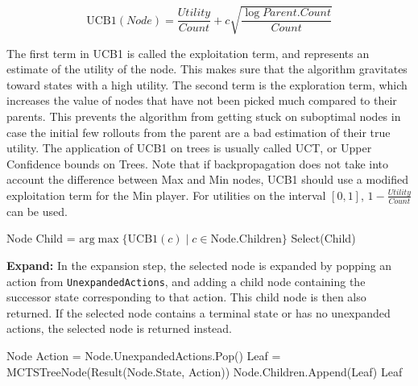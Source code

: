 \begin{equation}
    \text{UCB1}(Node) = \frac{Utility}{Count} + 
    c\sqrt{\frac{\log{Parent.Count}}{Count}}
\end{equation}

The first term in UCB1 is called the exploitation term, and represents
an estimate of the utility of the node. This makes sure that the algorithm
gravitates toward states with a high utility. The second term is the
exploration term, which increases the value of nodes that have not been
picked much compared to their parents. This prevents the algorithm from
getting stuck on suboptimal nodes in case the initial few rollouts from
the parent are a bad estimation of their true utility. The application
of UCB1 on trees is usually called UCT, or Upper Confidence bounds on Trees.
Note that if backpropagation does not take into account the difference
between Max and Min nodes, UCB1 should use a modified exploitation term 
for the Min player. For utilities on the interval $[0,1]$, 
$1 - \frac{Utility}{Count}$ can be used.
\begin{algorithm}
    \begin{algorithmic}[1]
                \State \Return Node
            \EndIf
            \State Child = 
            $\text{arg}\max \{ \text{UCB1}(c) \;|\; c \in \text{Node.Children} \}$ 
            \State \Return Select(Child)
        \EndProcedure
    \end{algorithmic}        
\end{algorithm}

\textbf{Expand:} In the expansion step, the selected node is expanded by 
popping an action from \lstinline|UnexpandedActions|, and adding a child 
node containing the successor state corresponding to that action. This
child node is then also returned. If the selected node contains a terminal 
state or has no unexpanded actions, the selected node is returned instead.

\begin{algorithm}
    \begin{algorithmic}[1]
                \State \Return Node
            \EndIf
            \State Action = Node.UnexpandedActions.Pop()
            \State Leaf = MCTSTreeNode(Result(Node.State, Action))
            \State Node.Children.Append(Leaf)
            \State \Return Leaf
        \EndProcedure
    \end{algorithmic}    
\end{algorithm}


